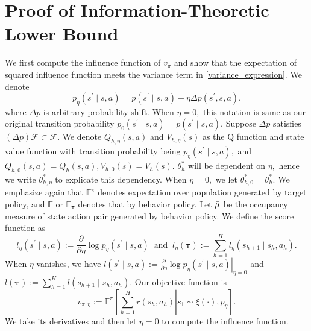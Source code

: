 \documentclass{article}
\numberwithin{equation}{section}
\theoremstyle{plain}
\theoremstyle{definition}
\theoremstyle{remark}
\begin{document}
\section{Proof of Information-Theoretic Lower Bound}
    We first compute the influence function of $v_{\pi}$ and show that the expectation of squared influence function meets the variance term in \eqref{variance_expression}. We denote 
    $$p_{\eta}(s^{\prime}\mid s,a) = p(s^{\prime} \mid s,a) + \eta \Delta p(s^{\prime},s,a).$$
    where $\Delta p$ is arbitrary probability shift. When $\eta = 0,$ this notation is same as our original transition probability $p_{0}(s^{\prime} \mid s,a) = p(s^{\prime} \mid s,a).$ Suppose $\Delta p$ satisfies $(\Delta p) \mathcal{F} \subset \mathcal{F}.$ We denote $Q_{h,\eta}(s,a)$ and $V_{h,\eta}(s)$ as the Q function and state value function with transition probability being $p_{\eta}(s^{\prime} \mid s,a),$ and $Q_{h,0}(s,a) = Q_h(s,a), V_{h,0}(s) = V_h(s).$ $\theta_h^*$ will be dependent on $\eta,$ hence we write $\theta_{h,\eta}^*$ to explicate this dependency. When $\eta = 0,$ we let $\theta_{h,0}^* = \theta_h^*.$ We emphasize again that $\mathbb{E}^{\pi}$ denotes expectation over population generated by target policy, and $\mathbb{E}$ or $\mathbb{E}_{\boldsymbol{\tau}}$ denotes that by behavior policy. Let $\Bar{\mu}$ be the occupancy measure of state action pair generated by behavior policy. We define the score function as 
    $$
    l_{\eta}(s^{\prime} \mid s,a) := \frac{\partial}{\partial \eta} \log p_{\eta}(s^{\prime} \mid s,a) \ \text{ and } \ 
    l_{\eta}(\boldsymbol{\tau}) := \sum_{h=1}^H l_{\eta}(s_{h+1} \mid s_h,a_h).    
    $$
    When $\eta$ vanishes, we have $l(s^{\prime} \mid s,a) := \left.\frac{\partial}{\partial \eta} \log p_{\eta}(s^{\prime} \mid s,a)\right|_{\eta = 0}$ and $l(\boldsymbol{\tau}) := \sum_{h=1}^H l(s_{h+1} \mid s_h,a_h).$ Our objective function is 
    $$v_{\pi,\eta} := \mathbb{E}^{\pi} \left[\left.\sum_{h=1}^H r(s_h,a_h) \right| s_1 \sim \xi(\cdot), p_{\eta}\right].$$
    We take its derivatives and then let $\eta = 0$ to compute the influence function.
\end{document}
